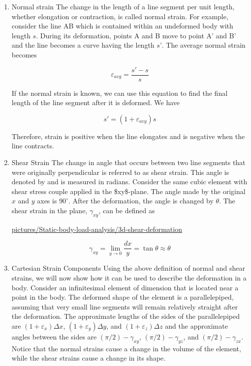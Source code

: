 \documentclass[a4paper,openany,12pt]{book}
\begin{document}
\begin{enumerate}
\item Normal strain
\label{sec:orge86e376}
The change in the length of a line segment per unit length, whether
elongation or contraction, is called normal strain. For example,
consider the line AB which is contained within an undeformed body with
length \(s\). During its deformation, points A and B move to point A' and
B' and the line becomes a curve having the length \(s’\). The average
normal strain becomes

$$\varepsilon _{avg} = \frac{s' - s}{s}$$

If the normal strain is known, we can use this equation to find the
final length of the line segment after it is deformed. We have

$$s' = (1 + \varepsilon _{avg})s$$

Therefore, strain is positive when the line elongates and is negative
when the line contracts.

\item Shear Strain
\label{sec:org01146ff}
The change in angle that occurs between two line segments that were
originally perpendicular is referred to as shear strain. This angle is
denoted by and is measured in radians. Consider the same cubic element
with shear stress couple applied in the \$xy\$-plane. The angle made by
the original \(x\) and \(y\) axes is \(90^{\circ}\). After the deformation, the
angle is changed by \(\theta\). The shear strain in the plane,
\(\gamma_{xy}\), can be defined as


\url{pictures/Static-body-load-analysis/3d-shear-deformation}

$$\gamma _{xy} = \mathop {\lim }\limits_{y \to 0} \frac{dx}{y} = \tan \theta  \approx \theta$$

\item Cartesian Strain Components
\label{sec:org2e2a18c}
Using the above definition of normal and shear strains, we will now show
how it can be used to describe the deformation in a body. Consider an
infinitesimal element of dimension that is located near a point in the
body. The deformed shape of the element is a parallelepiped, assuming
that very small line segments will remain relatively straight after the
deformation. The approximate lengths of the sides of the parallelepiped
are \((1 + \varepsilon_x)\Delta x\), \((1 + \varepsilon_y)\Delta y\), and
\((1 + \varepsilon_z)\Delta z\) and the approximate angles between the
sides are \((\pi /2) - \gamma_{xy}\), \((\pi /2) - \gamma_{yz}\), and
\((\pi /2) - \gamma _{zx}\). Notice that the normal strains cause a change
in the volume of the element, while the shear strains cause a change in
its shape.
\end{enumerate}
\end{document}
